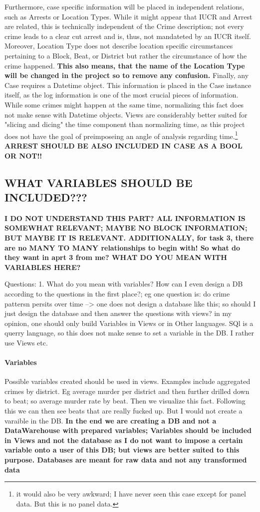 \documentclass[a4paper]{article}
\begin{document}
\indent Furthermore, case specific information will be placed in independent relations, such as Arrests or Location Types. While it might appear that IUCR and Arrest are related, this is technically independent of the Crime description; not every crime leads to a clear cut arrest and is, thus, not mandateted by an IUCR itself. Moreover, Location Type does not describe location specific circumstances pertaining to a Block, Beat, or District but rather the circumstance of how the crime happened. \textbf{This also means, that the name of the Location Type will be changed in the project so to remove any confusion.} 
\indent Finally, any Case requires a Datetime object. This information is placed in the Case instance itself, as the log information is one of the most crucial pieces of information. While some crimes might happen at the same time, normalizing this fact does not make sense with Datetime objects. Views are considerably better suited for "slicing and dicing" the time component than normalizing time, as this project does not have the goal of preimposeing an angle of analysis regarding time.\footnote{it would also be very awkward; I have never seen this case except for panel data. But this is no panel data.} 
\textbf{ARREST SHOULD BE ALSO INCLUDED IN CASE AS A BOOL OR NOT!! }


\subsection{WHAT VARIABLES SHOULD BE INCLUDED???}
\textbf{I DO NOT UNDERSTAND THIS PART? ALL INFORMATION IS SOMEWHAT RELEVANT; MAYBE NO BLOCK INFORMATION; BUT MAYBE IT IS RELEVANT. ADDITIONALLY, for task 3, there are no MANY TO MANY relationships to begin with! So what do they want in aprt 3 from me? WHAT DO YOU MEAN WITH VARIABLES HERE?}




Questions:
1. What do you mean with variables? How can I even design a DB according to the questions in the first place?; eg one question is: do crime pattersn persits over time --> one does not design a database like this; so should I just design the database and then answer the questions with views? in my opinion, one should only build Variables in Views or in Other languages. SQl is a querry language, so this does not make sense to set a variable in the DB. I rather use Views etc. 

\paragraph{Variables} Possible variables created should be used in views. Examples include aggregated crimes by district. Eg average murder per district and then further drilled down to beat; so average murder rate by beat. Then we visualize this fact. Following this we can then see beats that are really fucked up. But I would not create a varaible in the DB. \textbf{In the end we are creating a DB and not a DataWarehouse with prepared variables; Variables should be included in Views and not the database as I do not want to impose a certain variable onto a user of this DB; but views are better suited to this purpose. Databases are meant for raw data and not any transformed data}
\end{document}
